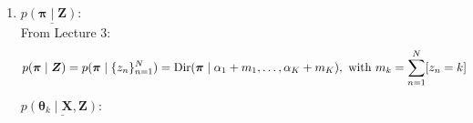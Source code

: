 



 \begin{enumerate}
   \item 
   \textbf{$\underline{p(\boldsymbol{\pi} \mid \boldsymbol{Z}):}$} \\
   
   From Lecture 3:
   \begin{align*}
       p(\boldsymbol{\pi} \mid \boldsymbol{Z}) &= p(\boldsymbol{\pi} \mid \{z_n\}_{n=1}^N) = \operatorname{Dir}(\boldsymbol{\pi} \mid \alpha_1 + m_1, \ldots ,\alpha_K + m_K), \text{ with } m_k = \sum_{n=1}^N [z_n = k]
   \end{align*}
   
   \textbf{$\underline{p(\boldsymbol{\theta}_k \mid \boldsymbol{X}, \boldsymbol{Z}):}$} 
   

\end{enumerate}
